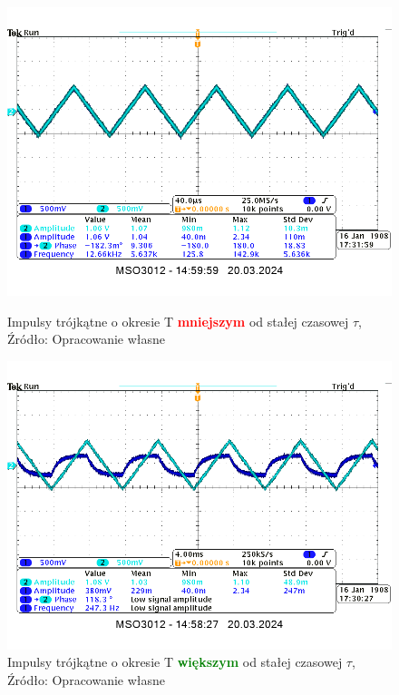 \documentclass{article}
\begin{document}
        \begin{figure}[!ht]
          \centering
          \begin{minipage}{.4\textwidth}
            \centering
            \includegraphics[scale=0.25]{grafiki/T_T_mniejszy.png}
            \caption{Impulsy trójkątne o okresie T \textbf{\textcolor{red}{mniejszym}} od stałej czasowej $\tau$,
              \\Źródło: Opracowanie własne}
          \end{minipage}
          \begin{minipage}{.4\textwidth}
            \centering
            \includegraphics[scale=0.25]{grafiki/T_T_wiekszy.png}
            \caption{Impulsy trójkątne o okresie T \textbf{\textcolor{green}{większym}} od stałej czasowej $\tau$,
            \\Źródło: Opracowanie własne}
          \end{minipage}
        \end{figure}
\end{document}
